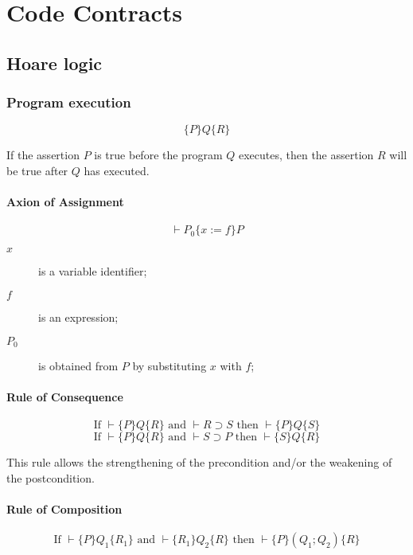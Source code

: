 
\chapter{Code Contracts} %

\label{AppendixC}

\section{Hoare logic}

\subsection{Program execution}
\[
	\{P\}Q\{R\}
\]

If the assertion \(P\) is true before the program \(Q\) executes, then the assertion \(R\) will be true after \(Q\) has executed.

\subsubsection{Axion of Assignment}

\[
	\vdash P_0 \{ x := f \} P
\]

\begin{description}
    \item [\(x\)] is a variable identifier;
    \item [\(f\)] is an expression;
    \item [\(P_0\)] is obtained from \(P\) by substituting \(x\) with \(f\);
\end{description}

\subsubsection{Rule of Consequence}
\[
	\textrm{If } \vdash \{P\}Q\{R\} \textrm{ and } \vdash R \supset S \textrm{ then } \vdash \{P\}Q\{S\}
\]
\[
	\textrm{If } \vdash \{P\}Q\{R\} \textrm{ and } \vdash S \supset P \textrm{ then } \vdash \{S\}Q\{R\}
\]

This rule allows the strengthening of the precondition and/or the weakening of the postcondition. 

\subsubsection{Rule of Composition}
\[
	\textrm{If } \vdash \{P\}Q_1\{R_1\} \textrm{ and } \vdash \{R_1\}Q_2\{R\} \textrm{ then } \vdash \{P\}(Q_1; Q_2)\{R\}
\]

